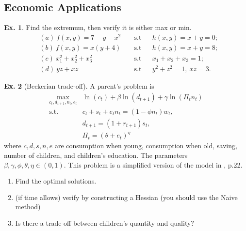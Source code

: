 \documentclass[11pt,a4paper]{book}
\theoremstyle{definition}\newtheorem{definition}{Definition}
\theoremstyle{definition}\newtheorem{fact}{Fact}
\theoremstyle{definition}\newtheorem{remark}{Remark}
\theoremstyle{definition}\newtheorem{ex}{Ex.}
\theoremstyle{definition}\newtheorem{project}{Project}
\theoremstyle{definition}\newtheorem{problem}{Problem}
\theoremstyle{definition}\newtheorem{example}{Example}
\numberwithin{theorem}{section}
\numberwithin{corollary}{chapter}
\numberwithin{assumption}{chapter}
\numberwithin{definition}{chapter}
\numberwithin{prop}{chapter}
\numberwithin{notation}{chapter}
\numberwithin{problem}{chapter}
\numberwithin{example}{chapter}
\numberwithin{fact}{chapter}
\numberwithin{ex}{chapter}
\begin{document}
	\subsection{Economic Applications}
	
	\begin{ex}
		Find the extremum, then verify it is either max or min.
		\begin{align*}
			& (a) \ f(x,y) = 7 - y - x^2  && \text{ s.t} && h(x,y) = x + y =0; \\
			& (b) \ f(x,y) = x(y+4) && \text{ s.t} && h(x,y) = x + y = 8; \\
			& (c) \ x_1^2+x_2^2+x_3^2 && \text{ s.t} && x_1+x_2+x_3=1; \\
			& (d) \ yz + xz && \text{ s.t} && y^2 + z^2 = 1, \ xz=3.
		\end{align*}
	\end{ex}
	
	\begin{ex}[Beckerian trade-off] \label{ex:ferti}
		A parent's problem is
		\begin{align*}
			\max_{c_t, d_{t+1}, n_t, e_t} & \ln(c_t) + \beta \ln (d_{t+1}) + \gamma \ln ( \Pi_t n_t) \\
			\text{s.t.}\ & c_t + s_t +e_tn_t = (1-\phi n_t) w_t, \\
			& d_{t+1} = (1+r_{t+1}) s_t, \\
			& \Pi_t = (\theta + e_t)^\eta
		\end{align*}
		where $c,d,s,n,e$ are consumption when young, consumption when old, saving, number of children, and children's education. The parameters $\beta,\gamma,\phi,\theta,\eta \in (0,1)$. This problem is a simplified version of the model in \citet{de2012fertility}, p.22. 
		\begin{enumerate}
			\item Find the optimal solutions.
			\item (if time allows) verify by constructing a Hessian (you should use the Naive method)
			\item Is there a trade-off between children's quantity and quality?
		\end{enumerate}
	\end{ex}
	
\end{document}
